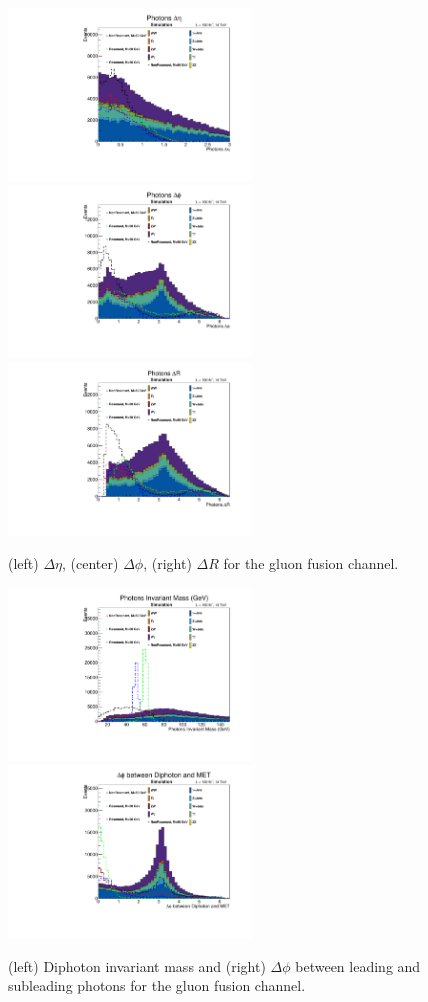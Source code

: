\documentclass[11pt]{article}
\begin{document}
\begin{figure}[htbp]
\centering
\includegraphics[height=1.8in]{figs/plots_ggh/Photon_deta.pdf}
\includegraphics[height=1.8in]{figs/plots_ggh/Photon_dphi.pdf}
\includegraphics[height=1.8in]{figs/plots_ggh/Photon_dr.pdf}
\caption{(left) $\Delta\eta$, (center) $\Delta\phi$, (right) $\Delta R$ for the gluon fusion channel.}
\label{fig:Photon_deta}
\end{figure}


\begin{figure}[htbp]
\centering
\includegraphics[height=1.8in]{figs/plots_ggh/Photon_iMass.pdf}
\includegraphics[height=1.8in]{figs/plots_ggh/dphi_ggMET_real.pdf}
\caption{(left) Diphoton invariant mass and (right) $\Delta \phi$ between leading and subleading photons for the gluon fusion channel.}
\label{fig:Photon_iMass}
\end{figure}
\end{document}
